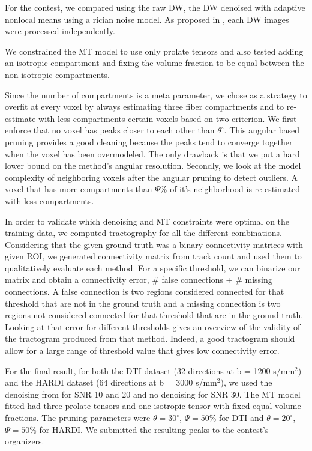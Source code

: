 \documentclass[9pt,conference,a4paper]{IEEEtran}
\begin{document}
\bigskip

For the contest, we compared using the raw DW, the DW denoised with adaptive nonlocal means \cite{manjon-coupe:10} using a rician noise model. 
As proposed in \cite{descoteaux-wiest-daessle-etal:08}, each DW images were processed independently. 

We constrained the MT model to use only prolate tensors and also tested adding an isotropic compartment and fixing the volume fraction to be equal between the non-isotropic compartments.

Since the number of compartments is a meta parameter, we chose as a strategy to overfit at every voxel by always estimating three fiber compartments and to re-estimate with less compartments certain voxels based on two criterion.
We first enforce that no voxel has peaks closer to each other than $\theta^\circ$.
This angular based pruning provides a good cleaning because the peaks tend to converge together when the voxel has been overmodeled.
The only drawback is that we put a hard lower bound on the method's angular resolution.
Secondly, we look at the model complexity of neighboring voxels after the angular pruning to detect outliers. 
A voxel that has more compartments than $\Psi$\% of it's neighborhood is re-estimated with less compartments.

In order to validate which denoising and MT constraints were optimal on the training data, we computed tractography for all the different combinations.
Considering that the given ground truth was a binary connectivity matrices with given ROI, we generated connectivity matrix from track count and used them to qualitatively evaluate each method.
For a specific threshold, we can binarize our matrix and obtain a connectivity error, $\#$ false connections + $\#$ missing connections. A false connection is two regions considered connected for that threshold that are not in the ground truth and a missing connection is two regions not considered connected for that threshold that are in the ground truth.
Looking at that error for different thresholds gives an overview of the validity of the tractogram produced from that method.
Indeed, a good tractogram should allow for a large range of threshold value that gives low connectivity error.

\bigskip

For the final result, for both the DTI dataset (32 directions at b = 1200 s/mm$^2$) and the HARDI dataset (64 directions at b = 3000 s/mm$^2$), we used the denoising from \cite{manjon-coupe:10} for SNR 10 and 20 and no denoising for SNR 30. The MT model fitted had three prolate tensors and one isotropic tensor with fixed equal volume fractions.
The pruning parameters were $\theta = 30^\circ$, $\Psi = 50$\% for DTI and $\theta = 20^\circ$, $\Psi = 50$\% for HARDI.
We submitted the resulting peaks to the contest's organizers. 
\end{document}
